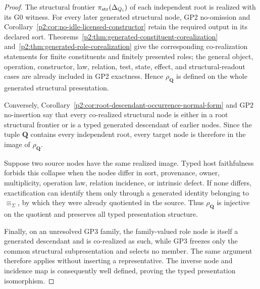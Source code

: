 \documentclass[12pt,a4paper]{article}
\begin{document}
\begin{proof}
The structural frontier \(\pi_{\rm str}(\Delta_{Q_i})\) of each independent
root is realized with its G0 witness.  For every later generated structural
node, GP2 no-omission and
Corollary~\ref{p2:cor:no-idle-licensed-constructor} retain the required output
in its declared sort.  Theorems~\ref{p2:thm:generated-constituent-corealization}
and~\ref{p2:thm:generated-role-corealization} give the corresponding
co-realization statements for finite constituents and finitely presented
roles; the general object, operation, constructor, law, relation, test, state,
effect, and structural-readout cases are already included in GP2 exactness.
Hence \(\rho_{\mathbf Q}\) is defined on the whole generated structural
presentation.

Conversely, Corollary~\ref{p2:cor:root-descendant-occurrence-normal-form}
and GP2 no-insertion say that every co-realized structural node is either in a
root structural frontier or is a typed generated descendant of earlier
nodes.  Since the tuple \(\mathbf Q\) contains every independent root, every
target node is therefore in the image of \(\rho_{\mathbf Q}\).

Suppose two source nodes have the same realized image.  Typed host
faithfulness forbids this collapse when the nodes differ in sort, provenance,
owner, multiplicity, operation law, relation incidence, or intrinsic defect.
If none differs, exactification can identify them only through a generated
identity belonging to \(\equiv_{\Sigma}\), by which they were already
quotiented in the source.  Thus \(\rho_{\mathbf Q}\) is injective on the
quotient and preserves all typed presentation structure.

Finally, on an unresolved GP3 family, the family-valued role node is itself a
generated descendant and is co-realized as such, while GP3 freezes only the
common structural subpresentation and selects no member.  The same argument
therefore applies without inserting a representative.  The inverse node and
incidence map is consequently well defined, proving the typed presentation
isomorphism.
\end{proof}
\end{document}
